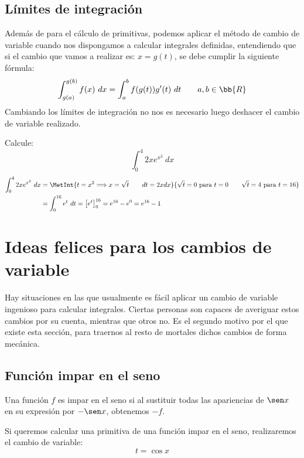 \subsection{Límites de integración}
Además de para el cálculo de primitivas, podemos aplicar el método de cambio de variable cuando nos dispongamos a calcular integrales definidas, entendiendo que si el cambio que vamos a realizar es: $x = g(t)$, se debe cumplir la siguiente fórmula:
\begin{equation*}
    \displaystyle\int_{g(a)}^{g(b)} f(x)~dx  = \displaystyle\int_{a}^{b} f(g(t))g'(t)~dt  \qquad a,b\in \bb{R}
\end{equation*}
Cambiando los límites de integración no nos es necesario luego deshacer el cambio de variable realizado.
\begin{ejemplo}
    Calcule:
    \begin{equation*}
        \displaystyle\int_{0}^{4} 2xe^{x^2}~dx 
    \end{equation*}
    \begin{align*}
        \displaystyle\int_{0}^{4} 2xe^{x^2}~dx &= \MetInt{t=x^2\Longrightarrow x=\sqrt{t}\qquad   dt = 2xdx}{\sqrt{t}=0\text{\ para\ }t=0\qquad \sqrt{t}=4\text{\ para\ }t=16} \\
                                               &= \displaystyle\int_{0}^{16} e^t~dt  = {\left[e^t\right]}_0^{16} = e^{16} - e^0 = e^{16}- 1
    \end{align*}

\end{ejemplo}

\section{Ideas felices para los cambios de variable}
Hay situaciones en las que usualmente es fácil aplicar un cambio de variable ingenioso para calcular integrales. Ciertas personas son capaces de averiguar estos cambios por su cuenta, mientras que otros no. Es el segundo motivo por el que existe esta sección, para traernos al resto de mortales dichos cambios de forma mecánica.

\subsection{Función impar en el seno}
\begin{definicion}
    Una función $f$ es impar en el seno si al sustituir todas las apariencias de $\sen x$ en su expresión por $-\sen x$, obtenemos $-f$.
\end{definicion}
Si queremos calcular una primitiva de una función impar en el seno, realizaremos el cambio de variable:
\begin{equation*}
    t = \cos x
\end{equation*}

